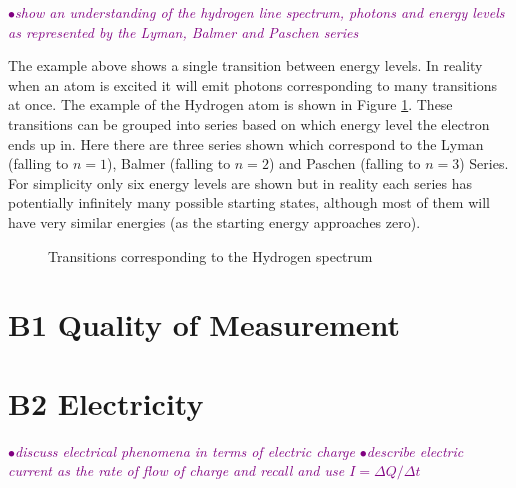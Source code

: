 \documentclass[a4paper,11pt,twoside]{memoir}
\newcounter{spec}[chapter]
\newcommand{\spec}[1]{\Needspace{5\baselineskip}\textcolor{purple}{$\bullet$\hspace{0.5cm}\textit{#1}}}
\begin{document}
\spec{show an understanding of the hydrogen line spectrum, photons and energy levels as represented by the Lyman, Balmer and Paschen series}

The example above shows a single transition between energy levels. In reality when an atom is excited it will emit photons corresponding to many transitions at once. The example of the Hydrogen atom is shown in Figure \ref{fig:hspec}. These transitions can be grouped into series based on which energy level the electron ends up in. Here there are three series shown which correspond to the Lyman (falling to $n=1$), Balmer (falling to $n=2$) and Paschen (falling to $n=3$) Series. For simplicity only six energy levels are shown but in reality each series has potentially infinitely many possible starting states, although most of them will have very similar energies (as the starting energy approaches zero).

\begin{figure}
  \begin{center}
  \end{center}
  \caption{Transitions corresponding to the Hydrogen spectrum}
  \label{fig:hspec}
\end{figure}
\chapter{B1 Quality of Measurement}

\chapter{B2 Electricity}
\spec{discuss electrical phenomena in terms of electric charge}
\spec{describe electric current as the rate of flow of charge and recall and use $I = \Delta Q / \Delta t$}
\end{document}
